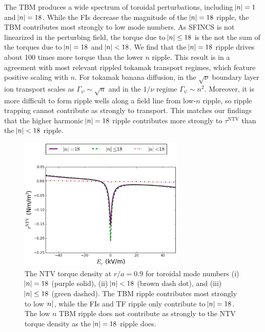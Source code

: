 \documentclass[aip, pop, preprint]{revtex4-1}
\begin{document}
The TBM produces a wide spectrum of toroidal perturbations, including $\abs{n} = 1$ and $\abs{n} = 18$. While the FIs decrease the magnitude of the $\abs{n} =18$ ripple, the TBM contributes most strongly to low mode numbers. As SFINCS is not linearized in the perturbing field, the torque due to $\abs{n} \leq 18$ is the not the sum of the torques due to $\abs{n} = 18$ and $\abs{n} < 18$.  We find that the $\abs{n} = 18$ ripple drives about 100 times more torque than the lower $n$ ripple. This result is in a agreement with most relevant rippled tokamak transport regimes, which feature positive scaling with $n$. For tokamak banana diffusion, in the $\sqrt{\nu}$ boundary layer \cite{Shaing2008} ion transport scales as $\Gamma_{\psi} \sim \sqrt{n}$ and in the $1/\nu$ regime \cite{Shaing2003} $\Gamma_{\psi} \sim n^2$. Moreover, it is more difficult to form ripple wells along a field line from low-$n$ ripple, so ripple trapping cannot contribute as strongly to transport. This matches our findings that the higher harmonic $\abs{n} = 18$ ripple contributes more strongly to $\tau^{\mathrm{NTV}}$ than the $\abs{n} < 18$ ripple. 

\begin{figure}[h!]
\centering
\includegraphics[width=0.7\textwidth]{figure8.eps}
\caption{\label{fig:Torque_comparingTBMandFI} The NTV torque density at $r/a = 0.9$ for toroidal mode numbers (i) $\abs{n} = 18$ (purple solid), (ii) $\abs{n} < 18$ (brown dash dot), and (iii) $\abs{n} \leq 18$ (green dashed). The TBM ripple contributes most strongly to low $\abs{n}$, while the FIs and TF ripple only contribute to $\abs{n} = 18$. The low $n$ TBM ripple does not contribute as strongly to the NTV torque density as the $\abs{n} = 18$ ripple does.}
\end{figure}
\end{document}
